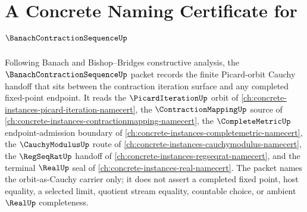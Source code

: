 \chapter{A Concrete Naming Certificate for $\BanachContractionSequenceUp$}
\label{ch:concrete-instances-banach-contraction-sequence-namecert}

Following Banach and Bishop--Bridges constructive analysis, the $\BanachContractionSequenceUp$ packet records the finite Picard-orbit Cauchy handoff that sits between the contraction iteration surface and any completed fixed-point endpoint. It reads the $\PicardIterationUp$ orbit of \autoref{ch:concrete-instances-picard-iteration-namecert}, the $\ContractionMappingUp$ source of \autoref{ch:concrete-instances-contractionmapping-namecert}, the $\CompleteMetricUp$ endpoint-admission boundary of \autoref{ch:concrete-instances-completemetric-namecert}, the $\CauchyModulusUp$ route of \autoref{ch:concrete-instances-cauchymodulus-namecert}, the $\RegSeqRatUp$ handoff of \autoref{ch:concrete-instances-regseqrat-namecert}, and the terminal $\RealUp$ seal of \autoref{ch:concrete-instances-real-namecert}. The packet names the orbit-as-Cauchy carrier only; it does not assert a completed fixed point, host equality, a selected limit, quotient stream equality, countable choice, or ambient $\RealUp$ completeness.


